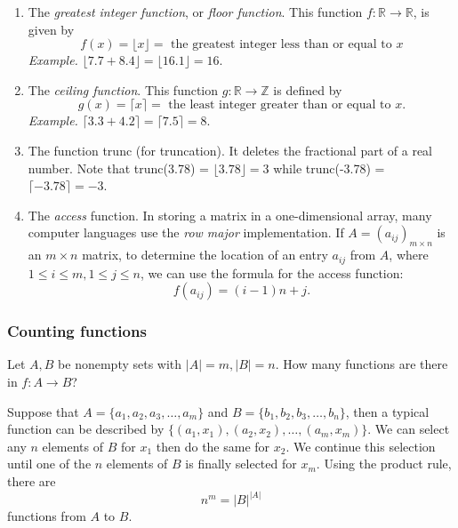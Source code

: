\documentclass[11pt]{article}
\begin{document}
        \begin{enumerate}
            \item The \emph{greatest integer function}, or \emph{floor function}. This function \(f: \mathbb{R \rightarrow \mathbb{R}}\), is given by \[f(x) = \lfloor x \rfloor = \text{ the greatest integer less than or equal to $x$}\] \emph{Example.} \(\lfloor 7.7 + 8.4 \rfloor = \lfloor 16.1 \rfloor = 16.\)
            \item The \emph{ceiling function}. This function \(g: \mathbb{R} \rightarrow \mathbb{Z}\) is defined by \[g(x) = \lceil x \rceil = \text{ the least integer greater than or equal to $x$.}\] \emph{Example.} \(\lceil 3.3 + 4.2 \rceil = \lceil 7.5 \rceil = 8.\)
            \item The function trunc (for truncation). It deletes the fractional part of a real number. Note that trunc(3.78) = \(\lfloor 3.78 \rfloor = 3\) while trunc(-3.78) = \(\lceil -3.78 \rceil = -3.\)
            \item The \emph{access} function. In storing a matrix in a one-dimensional array, many computer languages use the \emph{row major} implementation. If \(A = (a_{ij})_{m \times n}\) is an \(m \times n\) matrix, to determine the location of an entry \(a_{ij}\) from $A$, where \(1 \leq i \leq m, 1 \leq j \leq n\), we can use the formula for the access function: \[f(a_{ij}) = (i - 1)n + j.\]
        \end{enumerate}

        \subsubsection{Counting functions}

        Let \(A,B\) be nonempty sets with \(|A| = m, |B| = n.\) How many functions are there in \(f:A \rightarrow B\)?

        \vspace{1em}

        Suppose that \(A = \{a_1, a_2, a_3, \dots, a_m\}\) and \(B = \{b_1, b_2, b_3, \dots, b_n\}\), then a typical function can be described by \(\{(a_1, x_1), (a_2,x_2), \dots, (a_m, x_m)\}.\) We can select any $n$ elements of $B$ for \(x_1\) then do the same for \(x_2\). We continue this selection until one of the $n$ elements of $B$ is finally selected for \(x_m\). Using the product rule, there are \[n^m = |B|^{|A|}\] functions from $A$ to $B$.

        \vspace{1em}
\end{document}
